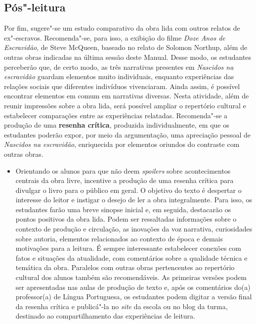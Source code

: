 \documentclass[12pt]{extarticle}
\begin{document}
\subsection{Pós"-leitura}


Por fim, sugere"-se um estudo comparativo da obra lida com
outros relatos de ex"-escravos. Recomenda"-se, para isso, a exibição do
filme \emph{Doze Anos de Escravidão}, de Steve McQueen, baseado no
relato de Solomon Northup, além de outras obras indicadas na última
sessão deste Manual. Desse modo, os estudantes perceberão que, de certo
modo, as três narrativas presentes em \emph{Nascidos na escravidão}
guardam elementos muito individuais, enquanto experiências das relações
sociais que diferentes indivíduos vivenciaram. Ainda assim, é possível
encontrar elementos em comum em narrativas diversas. Nesta atividade,
além de reunir impressões sobre a obra lida, será possível ampliar o
repertório cultural e estabelecer comparações entre as experiências
relatadas. Recomenda"-se a produção de uma \textbf{resenha crítica},
produzida individualmente, em que os estudantes poderão expor, por meio
da argumentação, uma apreciação pessoal de \emph{Nascidos na
escravidão}, enriquecida por elementos oriundos do contraste com outras
obras.

\begin{itemize}
\item
  Orientando os alunos para que não deem \emph{spoilers} sobre
  acontecimentos centrais da obra livre, incentive a produção de uma
  resenha crítica para divulgar o livro para o público em geral. O
  objetivo do texto é despertar o interesse do leitor e instigar o
  desejo de ler a obra integralmente. Para isso, os estudantes farão uma
  breve sinopse inicial e, em seguida, destacarão os pontos positivos da
  obra lida. Podem ser ressaltadas informações sobre o contexto de
  produção e circulação, as inovações da voz narrativa, curiosidades
  sobre autoria, elementos relacionados ao contexto de época e demais
  motivações para a leitura. É sempre interessante estabelecer conexões
  com fatos e situações da atualidade, com comentários sobre a qualidade
  técnica e temática da obra. Paralelos com outras obras pertencentes ao
  repertório cultural dos alunos também são recomendáveis. As primeiras
  versões podem ser apresentadas nas aulas de produção de texto e, após
  os comentários do(a) professor(a) de Língua Portuguesa, os estudantes
  podem digitar a versão final da resenha crítica e publicá"-la no
  \emph{site} da escola ou no blog da turma, destinado ao
  compartilhamento das experiências de leitura.
\end{itemize}
\end{document}
